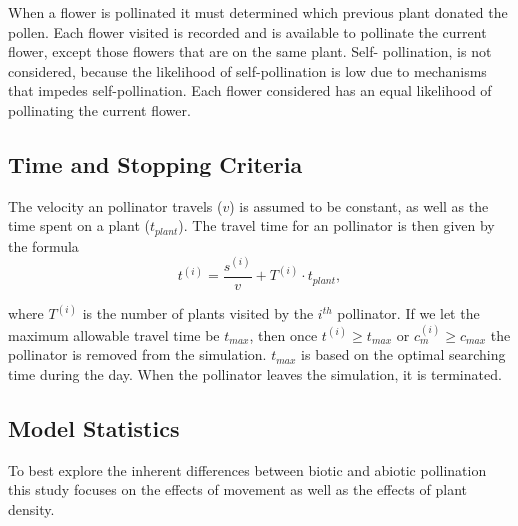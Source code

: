 When a flower is pollinated it must determined which previous plant donated the
pollen. Each flower visited is recorded and is available to pollinate the
current flower, except those flowers that are on the same plant. Self-
pollination, is not considered, because the likelihood of self-pollination is
low due to mechanisms that impedes self-pollination. Each flower considered has
an equal likelihood of pollinating the current flower.

\subsection{Time and Stopping Criteria}
The velocity an pollinator travels ($v$) is assumed to be constant, as well as
the time spent on a plant ($t_{plant}$).  The travel time for an pollinator is
then given by the formula
\[
  t^{\left(i\right)} = \frac{s^{\left(i\right)}}{v} + T^{\left(i\right)} \cdot t_{plant},
\]

where $T^{\left(i\right)}$ is the number of plants visited by the $i^{th}$
pollinator. If we let the maximum allowable travel time be $t_{max}$, then once
$t^{\left(i\right)} \geq t_{max}$ or $c^{\left(i\right)}_m \geq c_{max}$ the
pollinator is removed from the simulation. $t_{max}$ is based on the optimal
searching time during the day.  When the pollinator leaves the simulation, it is
terminated.

\subsection{Model Statistics}
To best explore the inherent differences between biotic and abiotic pollination
this study focuses on the effects of movement as well as the effects of plant
density.

